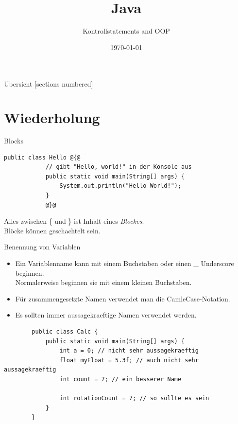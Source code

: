 


\title{Java}
\subtitle{Kontrollstatements and OOP}
\date{\today}




\begin{frame}
	\titlepage
\end{frame}

\begin{frame}{Übersicht}
	[sections numbered]
	\tableofcontents
\end{frame}


\section{Wiederholung }

\begin{frame}[fragile]{Blocks}
	\begin{lstlisting}[style=base]
		public class Hello @{@
			// gibt "Hello, world!" in der Konsole aus
			public static void main(String[] args) {
				System.out.println("Hello World!");
			}
			@}@
	\end{lstlisting}
	Alles zwischen \{ und \} ist Inhalt eines \emph{Blockes}. \\
	Blöcke können geschachtelt sein.
\end{frame}

\begin{frame}[fragile]{Benennung von Variablen}
	\begin{itemize}
		\item Ein Variablenname kann mit einem Buchstaben oder einen \_ Underscore beginnen. \\
		Normalerweise beginnen sie mit einem kleinen Buchstaben.
		\item Für zusammengesetzte Namen verwendet man die CamleCase-Notation.
		\item Es sollten immer aussagekraeftige Namen verwendet werden.
	\end{itemize}
	\begin{lstlisting}
		public class Calc {
			public static void main(String[] args) {
				int a = 0; // nicht sehr aussagekraeftig
				float myFloat = 5.3f; // auch nicht sehr aussagekraeftig
				int count = 7; // ein besserer Name
				
				int rotationCount = 7; // so sollte es sein
			}
		}
	\end{lstlisting}
\end{frame}

